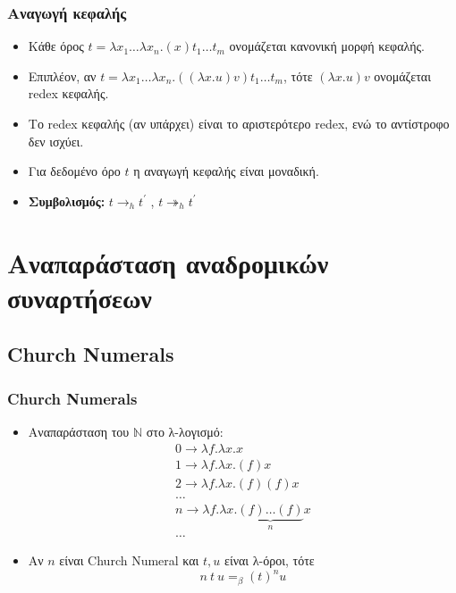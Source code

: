 \documentclass{beamer}
\begin{document}
\begin{frame}
\frametitle{Αναγωγή κεφαλής}
\begin{itemize}
\item Κάθε όρος $t = \lambda x_1 \ldots \lambda x_n . (x) t_1 \ldots t_m$ ονομάζεται κανονική μορφή κεφαλής.\pause
\item Επιπλέον, αν $t = \lambda x_1 \ldots \lambda x_n . ((\lambda x . u) v) t_1 \ldots t_m$, τότε $(\lambda x . u) v$ ονομάζεται redex κεφαλής.\pause
\item Το redex κεφαλής (αν υπάρχει) είναι το αριστερότερο redex, ενώ το αντίστροφο δεν ισχύει.\pause
\item Για δεδομένο όρο $t$ η αναγωγή κεφαλής είναι μοναδική.
\item \textbf{Συμβολισμός:} $t \rightarrow _h t^\prime$ , $t \twoheadrightarrow _h t^\prime$ \pause
\end{itemize}
\end{frame}


\section{Αναπαράσταση αναδρομικών συναρτήσεων}

\subsection{Church Numerals}

\begin{frame}
        \frametitle{Church Numerals}
        \begin{itemize}
                \item Αναπαράσταση του \( \mathbb{N} \) στο λ-λογισμό:
                \pause
	        	\[ \begin{array}{l}
	        		0 \rightarrow \lambda f . \lambda x . x \\
	        		1 \rightarrow \lambda f . \lambda x . (f) x \\
	        		2 \rightarrow \lambda f . \lambda x . (f) (f) x \\
	        		\ldots \\
	        		n \rightarrow \lambda f . \lambda x . \underbrace{(f) \ldots (f)}_n x \\
	        		\ldots
	        	\end{array} \]
	        	\pause
                \item Αν \(n \) είναι Church Numeral και \(t, u\) είναι λ-όροι, τότε
                \[ n\:t\:u =_\beta (t)^n u \]
        \end{itemize}
\end{frame}
\end{document}
